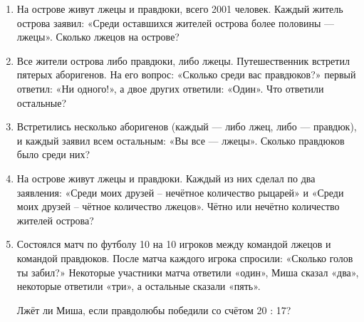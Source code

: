 \documentclass[12pt]{article}
\theoremstyle{definition}
\begin{document}
\begin{enumerate}
  \item На острове живут лжецы и правдюки, всего 2001 человек. 
  Каждый житель острова заявил: «Среди оставшихся жителей острова более половины — лжецы». 
  Сколько лжецов на острове? 

  \item Все жители острова либо правдюки, либо лжецы. Путешественник встретил пятерых аборигенов. 
  На его вопрос: «Сколько среди вас правдюков?» первый ответил: «Ни одного!», а двое других ответили: «Один». 
  Что ответили остальные?

  \item Встретились несколько аборигенов (каждый — либо лжец, либо — правдюк), и каждый заявил всем остальным: «Вы все — лжецы». 
  Сколько правдюков было среди них?

  \item На острове живут лжецы и правдюки. 
  Каждый из них сделал по два заявления: «Среди моих друзей – нечётное количество рыцарей» и «Среди моих друзей – чётное количество лжецов». 
  Чётно или нечётно количество жителей острова? 

  \item Состоялся матч по футболу 10 на 10 игроков между командой лжецов и командой правдюков. 
  После матча каждого игрока спросили: «Сколько голов ты забил?» 
  Некоторые участники матча ответили «один», Миша сказал «два», некоторые ответили «три», а остальные сказали «пять». 
  
  Лжёт ли Миша, если правдолюбы победили со счётом  20 : 17? 
\end{enumerate}


\newpage
\setcounter{section}{2}
\end{document}
